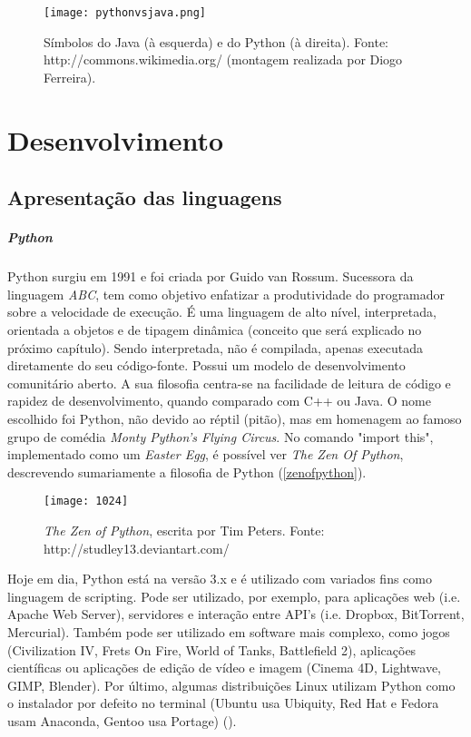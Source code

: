 \documentclass[11pt,openright,twoside]{report}
\begin{document}
\begin{figure}[H]
 \center
 \texttt{[image: pythonvsjava.png]}
 \caption{Símbolos do Java (à esquerda) e do Python (à direita). Fonte: http://commons.wikimedia.org/ (montagem realizada por Diogo Ferreira).}
 \label{pythonvsjava}
\end{figure}

\part{Desenvolvimento}

\chapter{Apresentação das linguagens}
\subsubsection{Python}
Python surgiu em 1991 e foi criada por Guido van Rossum. Sucessora da linguagem \textit{ABC}, tem como objetivo enfatizar a produtividade do programador sobre a velocidade de execução. É uma linguagem de alto nível, interpretada, orientada a objetos e de tipagem dinâmica (conceito que será explicado no próximo capítulo). Sendo interpretada, não é compilada, apenas executada diretamente do seu código-fonte. Possui um modelo de desenvolvimento comunitário aberto. A sua filosofia centra-se na facilidade de leitura de código e rapidez de desenvolvimento, quando comparado com C++ ou Java. O nome escolhido foi Python, não devido ao réptil (pitão), mas em homenagem ao famoso grupo de comédia \textit{Monty Python's Flying Circus}. No comando "import this", implementado como um \textit{Easter Egg}, é possível ver \textit{The Zen Of Python}, descrevendo sumariamente a filosofia de Python (\autoref{zenofpython}).

\begin{figure}
 \center
 \texttt{[image: 1024]}
 \caption{\textit{The Zen of Python}, escrita por Tim Peters. Fonte: http://studley13.deviantart.com/}
 \label{zenofpython}
\end{figure}

Hoje em dia, Python está na versão 3.x e é utilizado com variados fins como linguagem de scripting. Pode ser utilizado, por exemplo, para aplicações web (i.e. Apache Web Server), servidores e interação entre API's (i.e. Dropbox, BitTorrent, Mercurial). Também pode ser utilizado em software mais complexo, como jogos (Civilization IV, Frets On Fire, World of Tanks, Battlefield 2), aplicações científicas ou aplicações de edição de vídeo e imagem (Cinema 4D, Lightwave, GIMP, Blender). Por último, algumas distribuições Linux utilizam Python como o instalador por defeito no terminal (Ubuntu usa Ubiquity, Red Hat e Fedora usam Anaconda, Gentoo usa Portage) (\cite{Python}).
\medskip
\end{document}
